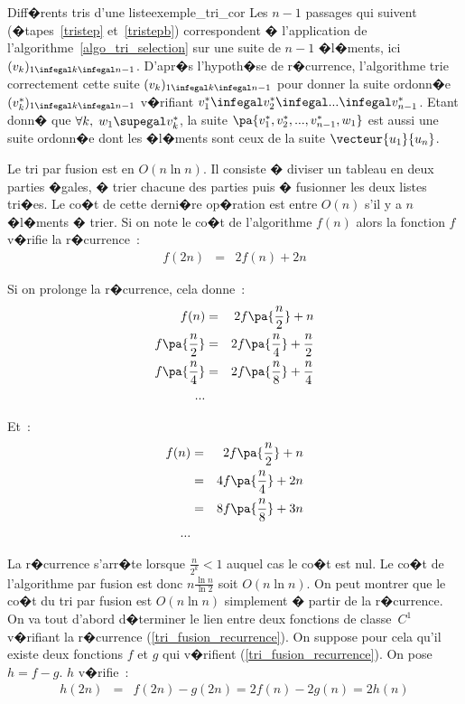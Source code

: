 \begin{xexempleprog2}{Diff�rents tris d'une liste}{exemple_tri_cor}
Les $n-1$ passages qui suivent (�tapes~\ref{tristep} et~\ref{tristepb}) correspondent � l'application de l'algorithme~\ref{algo_tri_selection} sur une suite de $n-1$ �l�ments, ici $(v_k)_{1 \infegal k \infegal n-1}$. D'apr�s l'hypoth�se de r�currence, l'algorithme trie correctement cette suite $(v_k)_{1 \infegal k \infegal n-1}$ pour donner la suite ordonn�e $(v^*_k)_{1 \infegal k \infegal n-1}$ v�rifiant $v^*_1 \infegal v^*_2 \infegal ... \infegal v^*_{n-1}$. Etant donn� que $\forall k, \; w_1 \supegal v^*_k$, la suite $\pa{ v^*_1,v^*_2, ..., v^*_{n-1}, w_1}$ est aussi une suite ordonn�e dont les �l�ments sont ceux de la suite $\vecteur{u_1}{u_n}$.


Le tri par fusion est en $O(n\ln n)$. Il consiste � diviser un tableau en deux parties �gales, � trier chacune des parties puis � fusionner les deux listes tri�es. Le co�t de cette derni�re op�ration est entre $O(n)$ s'il y a $n$ �l�ments � trier. Si on note le co�t de l'algorithme $f(n)$ alors la fonction $f$ v�rifie la r�currence~:
\begin{eqnarray}
f(2n) &=& 2f(n) + 2n \label{tri_fusion_recurrence}
\end{eqnarray}

Si on prolonge la r�currence, cela donne~:
\begin{eqnarray}
f(n) 							&=& 2 f\pa{\frac{n}{2}} + n \\
f\pa{\frac{n}{2}} &=& 2 f\pa{\frac{n}{4}} + \frac{n}{2} \\
f\pa{\frac{n}{4}} &=& 2 f\pa{\frac{n}{8}} + \frac{n}{4} \\
...&&
\end{eqnarray}

Et~:
\begin{eqnarray}
f(n) 		&=& 2 f\pa{\frac{n}{2}} +  n \\
 				&=& 4 f\pa{\frac{n}{4}} + 2n \\
				&=& 8 f\pa{\frac{n}{8}} + 3n \\
...&&
\end{eqnarray}

La r�currence s'arr�te lorsque $\frac{n}{2^k} < 1$ auquel cas le co�t est nul. Le co�t de l'algorithme par fusion est donc $n \frac{\ln n}{\ln 2}$ soit $O(n\ln n)$. On peut montrer que le co�t du tri par fusion est $O(n \ln n)$ simplement � partir de la r�currence. On va tout d'abord d�terminer le lien entre deux fonctions de classe~$C^1$ v�rifiant la r�currence (\ref{tri_fusion_recurrence}). On suppose pour cela qu'il existe deux fonctions $f$ et $g$ qui v�rifient (\ref{tri_fusion_recurrence}). On pose $h = f -g$. $h$ v�rifie~:
\begin{eqnarray}
h(2n) &=& f(2n) - g(2n) = 2 f(n) - 2 g(n) = 2 h(n) \label{eq_fonc_10}
\end{eqnarray}


\end{xexempleprog2}
